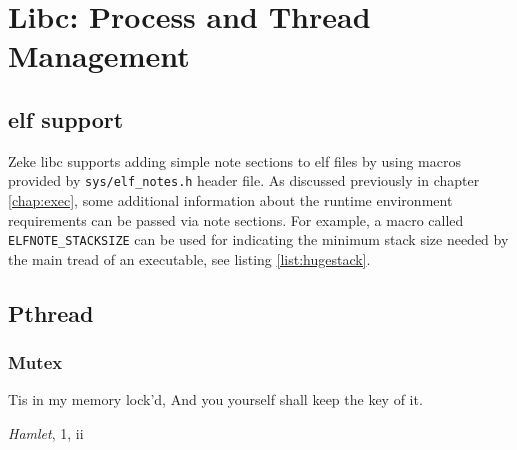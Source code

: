 \chapter{Libc: Process and Thread Management}

\section{\acs{elf} support}\label{sec:libc_elf}

Zeke libc supports adding simple note sections to \acs{elf} files by using
macros provided by \verb+sys/elf_notes.h+ header file. As discussed
previously in chapter \ref{chap:exec}, some additional information about the
runtime environment requirements can be passed via note sections. For example,
a macro called \verb+ELFNOTE_STACKSIZE+ can be used for indicating the minimum
stack size needed by the main tread of an executable, see listing
\ref{list:hugestack}.



\section{Pthread}
\subsection{Mutex}

\epigraph{Tis in my memory lock'd,\newline
          And you yourself shall keep the key of it.}{\textit{Hamlet}, 1, ii}

